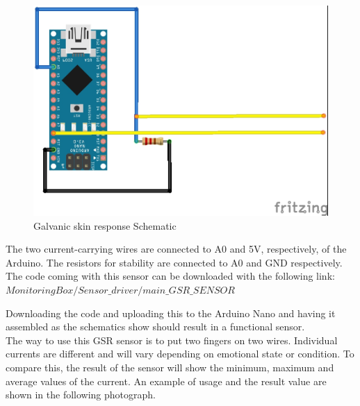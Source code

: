 \documentclass{report}
\begin{document}
\begin{figure}[H]
\begin{center}
\includegraphics[scale=1.25]{images/GSR.jpg}
\caption{Galvanic skin response Schematic}
\end{center}
\end{figure}

The two current-carrying wires are connected to A0 and 5V, respectively, of the Arduino. The resistors for stability are connected to A0 and GND respectively.	\\

The code coming with this sensor can be downloaded with the following link: $ MonitoringBox/Sensor\_driver/main\_GSR\_SENSOR $


Downloading the code and uploading this to the Arduino Nano and having it assembled as the schematics show should result in a functional sensor.\\

The way to use this GSR sensor is to put two fingers on two wires. Individual currents are different and will vary depending on emotional state or condition. To compare this, the result of the sensor will show the minimum, maximum and average values ​​of the current. An example of usage and the result value are shown in the following photograph.

%

%	
\end{document}
